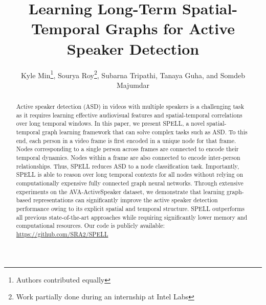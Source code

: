 \documentclass[runningheads]{llncs}
\begin{document}
\pagestyle{headings}
\mainmatter
\def\ECCVSubNumber{6599}  

\title{Learning Long-Term Spatial-Temporal Graphs for Active Speaker Detection} 

\begin{comment}
\titlerunning{SPELL for Active Speaker Detection} 
\authorrunning{ECCV-22 submission ID \ECCVSubNumber} 
\author{Anonymous ECCV submission}
\institute{Paper ID \ECCVSubNumber}
\end{comment}
\makeatletter
\renewcommand*{\@fnsymbol}[1]{\ifcase#1\or\else\@\fi}
\makeatother

\author{Kyle Min\thanks{Authors contributed equally},
Sourya Roy\thanks{Work partially done during an internship at Intel Labs},
Subarna Tripathi,
Tanaya Guha, and
Somdeb Majumdar}



\maketitle

\label{abs}
\begin{abstract}





Active speaker detection (ASD) in videos with multiple speakers is a challenging task as it requires learning effective audiovisual features and spatial-temporal correlations over long temporal windows. In this paper, we present SPELL, a novel spatial-temporal graph learning framework that can solve complex tasks such as ASD. To this end, each person in a video frame is first encoded in a unique node for that frame. Nodes corresponding to a single person across frames are connected to encode their temporal dynamics. Nodes within a frame are also connected to encode inter-person relationships. Thus, SPELL reduces ASD to a node classification task. Importantly, SPELL is able to reason over long temporal contexts for all nodes without relying on computationally expensive fully connected graph neural networks. Through extensive experiments on the AVA-ActiveSpeaker dataset, we demonstrate that learning graph-based representations can significantly improve the active speaker detection performance owing to its explicit spatial and temporal structure. SPELL outperforms all previous state-of-the-art approaches while requiring significantly lower memory and computational resources. Our code is publicly available: \url{https://github.com/SRA2/SPELL}

\end{abstract} 
\end{document}

